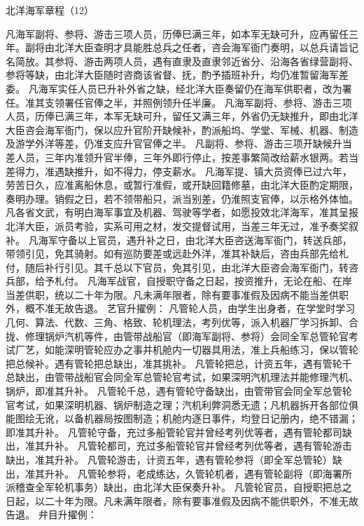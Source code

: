\documentclass[12pt,UTF8]{ctexbook}
\begin{document}
北洋海军章程（12）

凡海军副将、参将、游击三项人员，历俸巳满三年，如本军无缺可升，应再留任三年。副将由北洋大臣查明才具能胜总兵之任者，咨会海军衙门奏明，以总兵请旨记名简放。其参将、游击两项人员，遇有直隶及直隶邻近省分、沿海各省绿营副将、参将等缺，由北洋大臣随时咨商该省督、抚，酌予插班补升，均仍准暂留海军差委。
凡海军实任人员已升补外省之缺，经北洋大臣奏留仍在海军供职者，改为署任。准其支领署任官俸之半，并照例领升任半廉。
凡海军副将、参将、游击三项人员，历俸已满三年，本军无缺可升，留任又满三年，外省仍无缺推升，即由北洋大臣咨会海军衙门，保以应升官阶开缺候补，酌派船坞、学堂、军械、机器、制造及游学外洋等差，仍准支应升官官俸之半。
凡副将、参将、游击三项开缺候升当差人员，三年内准领升官半俸，三年外即行停止，按差事繁简改给薪水银两。若当差得力，准遇缺推升，如不得力，停支薪水。
凡海军提、镇大员资俸已过六年，劳苦日久，应准离船休息，或暂行准假，或开缺回籍修墓，由北洋大臣酌定期限，奏明办理。销假之日，若不领带船只，派当别差，仍淮照支官俸，以示格外体恤。
凡各省文武，有明白海军事宜及机器、驾驶等学者，如愿投效北洋海军，准其呈报北洋大臣，派员考验，实系可用之材，发交提督试用，当差三年无过，准予奏奖叙补。
凡海军守备以上官员，遇升补之日，由北洋大臣咨送海军衙门，转送兵部，带领引见，免其骑射。如有巡防要差或远赴外洋，准其补缺后，咨由兵部先给札付，随后补行引见。其千总以下官员，免其引见，由北洋大臣咨会海军衙门，转咨兵部，给予札付。
凡海军战官，自授职守备之日起，按资推升，无论在船、在岸当差供职，统以二十年为限。凡未满年限者，除有要事准假及因病不能当差供职外，概不准无故告退。
艺官升擢例：
凡管轮人员，由学生出身者，在学堂时学习几何、算法、代数、三角、格致、轮机理法，考列优等，派入机器厂学习拆卸、合拢、修理锅炉汽机等件，由管带战船官（即海军副将、参将）会同全军总管轮官考试厂艺，如能深明管轮应办之事并机舱内一切器具用法，准上兵船练习，保以管轮把总候补。遇有管轮把总缺出，准其挑补。
凡管轮把总，计资五年，遇有管轮千总缺出，由管带战船官会同全军总管轮官考试，如果深明汽机理法并能修理汽机、锅炉，即准其升补。
凡管轮千总，遇有管轮守备缺出，由管带官会同全军总管轮官考试，如果深明机器、锅炉制造之理；汽机利弊洞悉无遗；凡机器拆开各部位俱能图绘无讹，以备机器局按图制造；机舱内逐日事件，均登日记册内，绝不错漏；即准其升补。
凡管轮守备，充过多船管轮官并曾经考列优等者，遇有管轮都司缺出，准其升补。
凡管轮都司，充过多船管轮官并曾经考列优等者，遇有管轮游击缺出，准其升补。
凡管轮游击，计资五年，遇有管轮参将（即全军总管轮）缺出，准其升补。
凡管轮参将，老成练达，久管轮机者，遇有管轮副将（即海署所派稽查全军轮机事务）缺出，由北洋大臣保奏升补。
凡管轮官员，自授职把总之日起，以二十年为限。凡未满年限者，除有要事准假及因病不能供职外，不准无故告退。
弁目升擢例：
\end{document}
